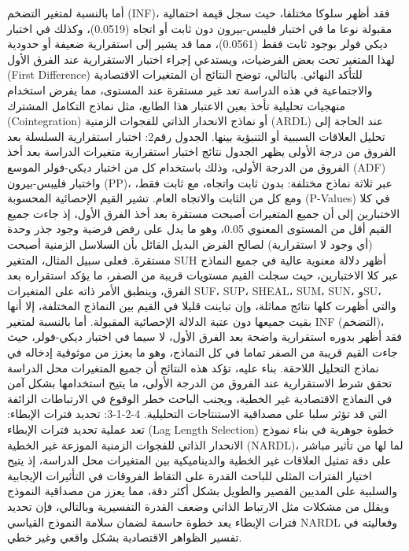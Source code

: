 \documentclass[12pt,a4paper]{report}
\begin{document}
أما بالنسبة لمتغير التضخم (INF)، فقد أظهر سلوكا مختلفا، حيث سجل قيمة احتمالية مقبولة نوعا ما في اختبار فليبس-بيرون دون ثابت أو اتجاه (0.0519)، وكذلك في اختبار ديكي فولر بوجود ثابت فقط (0.0561)، مما قد يشير إلى استقرارية ضعيفة أو حدودية لهذا المتغير تحت بعض الفرضيات، ويستدعي إجراء اختبار الاستقرارية عند الفرق الأول (First Difference) للتأكد النهائي.
بالتالي، توضح النتائج أن المتغيرات الاقتصادية والاجتماعية في هذه الدراسة تعد غير مستقرة عند المستوى، مما يفرض استخدام منهجيات تحليلية تأخذ بعين الاعتبار هذا الطابع، مثل نماذج التكامل المشترك (Cointegration) أو نماذج الانحدار الذاتي للفجوات الزمنية (ARDL) عند الحاجة إلى تحليل العلاقات السببية أو التنبؤية بينها.
الجدول رقم2: اختبار استقرارية السلسلة بعد الفروق من درجة الأولى
يظهر الجدول نتائج اختبار استقرارية متغيرات الدراسة بعد أخذ الفروق من الدرجة الأولى، وذلك باستخدام كل من اختبار ديكي-فولر الموسع (ADF) واختبار فليبس-بيرون (PP)، عبر ثلاثة نماذج مختلفة: بدون ثابت واتجاه، مع ثابت فقط، ومع كل من الثابت والاتجاه العام.
تشير القيم الإحصائية المحسوبة (P-Values) في كلا الاختبارين إلى أن جميع المتغيرات أصبحت مستقرة بعد أخذ الفرق الأول، إذ جاءت جميع القيم أقل من المستوى المعنوي 0.05، وهو ما يدل على رفض فرضية وجود جذر وحدة (أي وجود لا استقرارية) لصالح الفرض البديل القائل بأن السلاسل الزمنية أصبحت مستقرة.
فعلى سبيل المثال، المتغير SUH أظهر دلالة معنوية عالية في جميع النماذج عبر كلا الاختبارين، حيث سجلت القيم مستويات قريبة من الصفر، ما يؤكد استقراره بعد الفرق، وينطبق الأمر ذاته على المتغيرات SUF، SUP، SHEAL، SUM، SUN، وSU، والتي أظهرت كلها نتائج مماثلة، وإن تباينت قليلا في القيم بين النماذج المختلفة، إلا أنها بقيت جميعها دون عتبة الدلالة الإحصائية المقبولة.
أما بالنسبة لمتغير INF (التضخم)، فقد أظهر بدوره استقرارية واضحة بعد الفرق الأول، لا سيما في اختبار ديكي-فولر، حيث جاءت القيم قريبة من الصفر تماما في كل النماذج، وهو ما يعزز من موثوقية إدخاله في نماذج التحليل اللاحقة.
بناء عليه، تؤكد هذه النتائج أن جميع المتغيرات محل الدراسة تحقق شرط الاستقرارية عند الفروق من الدرجة الأولى، ما يتيح استخدامها بشكل آمن في النماذج الاقتصادية غير الخطية، ويجنب الباحث خطر الوقوع في الارتباطات الزائفة التي قد تؤثر سلبا على مصداقية الاستنتاجات التحليلية.
4-2-1-3:  تحديد فترات الإبطاء:
تعد عملية تحديد فترات الإبطاء (Lag Length Selection) خطوة جوهرية في بناء نموذج الانحدار الذاتي للفجوات الزمنية الموزعة غير الخطية (NARDL)، لما لها من تأثير مباشر على دقة تمثيل العلاقات غير الخطية والديناميكية بين المتغيرات محل الدراسة، إذ يتيح اختيار الفترات المثلى للباحث القدرة على التقاط الفروقات في التأثيرات الإيجابية والسلبية على المديين القصير والطويل بشكل أكثر دقة، مما يعزز من مصداقية النموذج ويقلل من مشكلات مثل الارتباط الذاتي وضعف القدرة التفسيرية وبالتالي، فإن تحديد فترات الإبطاء يعد خطوة حاسمة لضمان سلامة النموذج القياسي NARDL وفعاليته في تفسير الظواهر الاقتصادية بشكل واقعي وغير خطي.
\end{document}
